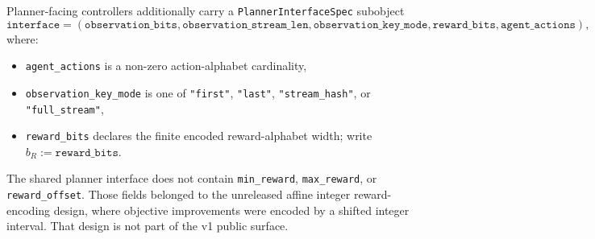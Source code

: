 \documentclass[11pt]{article}
\begin{document}
Planner-facing controllers additionally carry a
\texttt{PlannerInterfaceSpec} subobject
\[
\texttt{interface}=
(\texttt{observation\_bits},\texttt{observation\_stream\_len},
\texttt{observation\_key\_mode},\texttt{reward\_bits},
\texttt{agent\_actions}),
\]
where:
\begin{itemize}
    \item \texttt{agent\_actions} is a non-zero action-alphabet cardinality,
    \item \texttt{observation\_key\_mode} is one of
    \texttt{"first"}, \texttt{"last"}, \texttt{"stream\_hash"}, or
    \texttt{"full\_stream"},
    \item \texttt{reward\_bits} declares the finite encoded reward-alphabet
    width; write $b_R:=\texttt{reward\_bits}$.
\end{itemize}

The shared planner interface does not contain
\texttt{min\_reward}, \texttt{max\_reward}, or
\texttt{reward\_offset}. Those fields belonged to the unreleased affine
integer reward-encoding design, where objective improvements were encoded by a
shifted integer interval. That design is not part of the v1 public surface.
\end{document}
